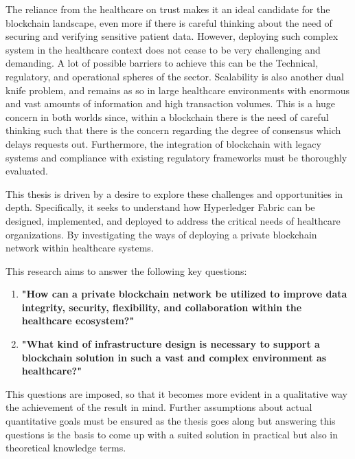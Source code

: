 The reliance from the healthcare on trust makes it an ideal candidate for the blockchain landscape, even 
more if there is careful thinking about the need of securing and verifying sensitive patient data. However, 
deploying such complex system in the healthcare context does not cease to be very challenging and demanding. A lot
of possible barriers to achieve this can be the Technical, regulatory, and operational spheres 
of the sector. Scalability is also another dual knife problem, and remains as so in large healthcare
environments with enormous and vast amounts of information and high transaction volumes. This is a huge concern 
in both worlds since, within a blockchain there is the need of careful thinking such that there is the concern 
regarding the degree of consensus which delays requests out. Furthermore, the integration of blockchain with 
legacy systems and compliance with existing regulatory frameworks must be thoroughly evaluated.

This thesis is driven by a desire to explore these challenges and opportunities in depth. Specifically, 
it seeks to understand how Hyperledger Fabric can be designed, implemented, and deployed to address the critical 
needs of healthcare organizations. By investigating the ways of deploying a private blockchain network within 
healthcare systems.

This research aims to answer the following key questions:
\begin{enumerate}
\item \textbf{"How can a private blockchain network be utilized to improve data integrity, security, flexibility, and collaboration within the healthcare ecosystem?"}
\item \textbf{"What kind of infrastructure design is necessary to support a blockchain solution in such a vast and complex environment as healthcare?"}
\end{enumerate}

This questions are imposed, so that it becomes more evident in a qualitative way the achievement of the result
in mind. Further assumptions about actual quantitative goals must be ensured as the thesis goes along but answering
this questions is the basis to come up with a suited solution in practical but also in theoretical knowledge terms.

